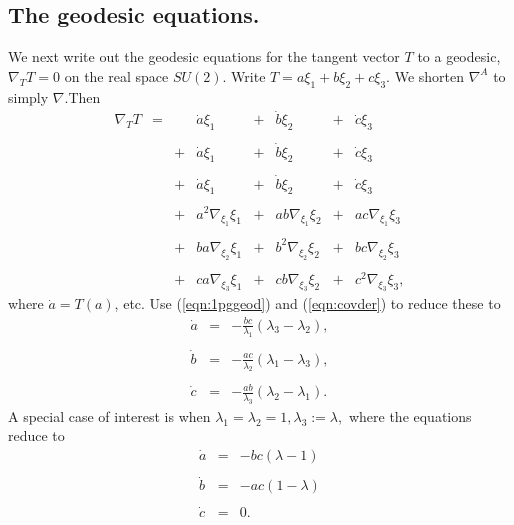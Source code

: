 \documentclass[12pt,reqno]{amsart}\usepackage{amssymb,amsmath,amscd,epsfig,amsthm,enumerate,import,eufrak}
\theoremstyle{definition}
\theoremstyle{remark}
\numberwithin{equation}{section}
\theoremstyle{plain}
\theoremstyle{definition}
\theoremstyle{remark}
\numberwithin{theorem}{section}
\begin{document}
\subsection{The geodesic equations.} We next write out the geodesic equations for the tangent vector $T$ to a geodesic, $\nabla_TT = 0$ on the real space $SU(2)$. 
%
%
%
%
Write $T = a \xi_1 + b \xi_2 + c \xi_3$. We shorten $\nabla^A$ to simply $\nabla$.Then
%
\[\begin{array}{cclccccc}
	\nabla_TT & = &  & \dot{a} \xi_1 & + & \dot{b} \xi_2 & + & \dot{c} \xi_3 \\
	&&&&&&&\\
	&& + & \dot{a} \xi_1 & + & \dot{b} \xi_2 & + & \dot{c} \xi_3 \\
	&&&&&&&\\
	&& + & \dot{a} \xi_1 & + & \dot{b} \xi_2 & + & \dot{c} \xi_3 \\
	&&&&&&&\\
	&& + & a^2 \nabla_{\xi_1}\xi_1  & + & ab \nabla_{\xi_1}\xi_2  & + & ac \nabla_{\xi_1}\xi_3 \\
	&&&&&&&\\
	&& + & ba \nabla_{\xi_2}\xi_1 & + & b^2 \nabla_{\xi_2}\xi_2 & + & bc \nabla_{\xi_2}\xi_3 \\
	&&&&&&&\\
	&& + & ca \nabla_{\xi_3}\xi_1 & + & cb \nabla_{\xi_3}\xi_2 & + & c^2 \nabla_{\xi_3}\xi_3,	
	\end{array}\]
%
where $\dot{a} = T(a)$, etc. Use (\ref{eqn:1pggeod}) and (\ref{eqn:covder}) to reduce these to
%
\begin{equation}\label{eqn:geodeqns}
	\begin{array}{lcr}
		\dot{a} & = & - \frac{bc}{\lambda_1}(\lambda_3 - \lambda_2),\\
		&&\\
		\dot{b} & = & - \frac{ac}{\lambda_2}(\lambda_1 - \lambda_3),\\
		&&\\
		\dot{c} & = & - \frac{ab}{\lambda_3}(\lambda_2 - \lambda_1).
	\end{array}
\end{equation}
%
A special case of interest is when $\lambda_1 = \lambda_2 = 1, \lambda_3 := \lambda,$ where the equations reduce to 
\begin{equation}\label{eqn:geodeqns1}
	\begin{array}{rcl}
		\dot{a} & = & -bc(\lambda - 1) \\
		&&\\
		\dot{b} & = & - ac(1 - \lambda) \\
		&&\\
		\dot{c} & = & 0.
	\end{array}
\end{equation}
%
%
%
%
%
%
%
%
%
%
\end{document}
